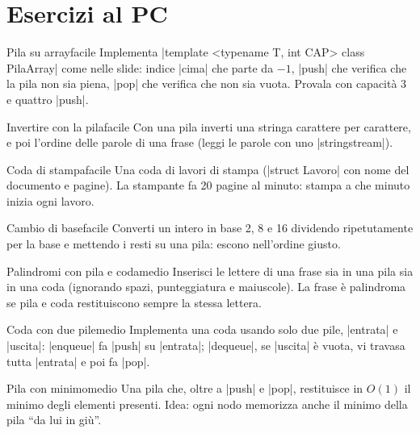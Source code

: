 \section{Esercizi al PC}

\begin{esercizio}{Pila su array}{facile}
Implementa \cc|template <typename T, int CAP> class PilaArray| come nelle slide: indice
\cc|cima| che parte da $-1$, \cc|push| che verifica che la pila non sia piena,
\cc|pop| che verifica che non sia vuota. Provala con capacità 3 e quattro \cc|push|.
\end{esercizio}

\begin{esercizio}{Invertire con la pila}{facile}
Con una pila inverti una stringa carattere per carattere, e poi l'ordine delle parole di
una frase (leggi le parole con uno \cc|stringstream|).
\end{esercizio}

\begin{esercizio}{Coda di stampa}{facile}
Una coda di lavori di stampa (\cc|struct Lavoro| con nome del documento e pagine). La
stampante fa 20 pagine al minuto: stampa a che minuto inizia ogni lavoro.
\end{esercizio}

\begin{esercizio}{Cambio di base}{facile}
Converti un intero in base 2, 8 e 16 dividendo ripetutamente per la base e mettendo i
resti su una pila: escono nell'ordine giusto.
\end{esercizio}

\begin{esercizio}{Palindromi con pila e coda}{medio}
Inserisci le lettere di una frase sia in una pila sia in una coda (ignorando spazi,
punteggiatura e maiuscole). La frase è palindroma se pila e coda restituiscono sempre la
stessa lettera.
\end{esercizio}

\begin{esercizio}{Coda con due pile}{medio}
Implementa una coda usando solo due pile, \cc|entrata| e \cc|uscita|: \cc|enqueue| fa
\cc|push| su \cc|entrata|; \cc|dequeue|, se \cc|uscita| è vuota, vi travasa tutta
\cc|entrata| e poi fa \cc|pop|.
\end{esercizio}

\begin{esercizio}{Pila con minimo}{medio}
Una pila che, oltre a \cc|push| e \cc|pop|, restituisce in $O(1)$ il minimo degli elementi
presenti. Idea: ogni nodo memorizza anche il minimo della pila ``da lui in giù''.
\end{esercizio}

